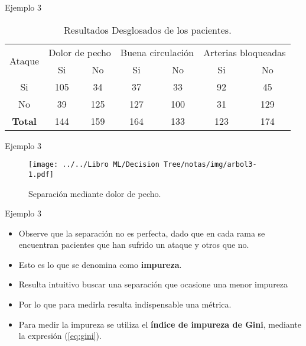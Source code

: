 \documentclass[11pt,aspectratio=169]{beamer}
\begin{document}
\begin{frame}{Ejemplo 3}
	\begin{table}
		\centering
		\begin{tabular}{c||cc|cc|cc}
		  \toprule
		  \multirow{2}{*}{Ataque} & \multicolumn{2}{c}{Dolor de pecho} & \multicolumn{2}{c}{Buena circulación} & \multicolumn{2}{c}{Arterias bloqueadas} \\  
								  & Si               & No              & Si                & No                & Si                 & No                 \\ \midrule
		  Si                      & 105              & 34              & 37                & 33                & 92                 & 45                 \\ \midrule
		  No                      & 39               & 125             & 127               & 100               & 31                 & 129                \\ \midrule\midrule
		  \textbf{Total}          & 144              & 159             & 164               & 133               & 123                & 174                \\ 
		  \bottomrule
		\end{tabular}
		\caption{Resultados Desglosados de los pacientes.}
		\label{tab:datosTotalesDesglosados}
	  \end{table}
\end{frame}

\begin{frame}{Ejemplo 3}
	\begin{figure}[H]
		\centering
		\texttt{[image: ../../Libro ML/Decision Tree/notas/img/arbol3-1.pdf]}
		\caption{Separación mediante dolor de pecho.}
		\label{fig:arbol3-1}
	\end{figure}
\end{frame}

\begin{frame}{Ejemplo 3}
	\begin{itemize}
		\item Observe que la separación no es perfecta, dado que en cada rama se encuentran pacientes que han 
			sufrido un ataque y otros que no.\pause
		\item Esto es lo que se denomina como \textbf{impureza}. \pause
		\item Resulta intuitivo buscar una separación que ocasione una menor impureza\pause
		\item Por lo que para medirla resulta indispensable una métrica. \pause
		\item Para medir la impureza se utiliza el
		\textbf{índice de impureza de Gini}\cite{breiman2017classification}\cite{gelfand}, mediante la expresión (\ref{eq:gini}). 
	\end{itemize} 
\end{frame}
\end{document}
